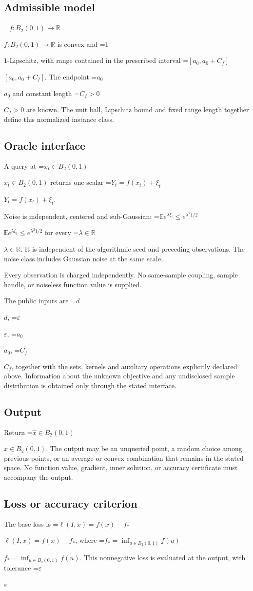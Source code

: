 \documentclass[10pt,a4paper]{article}
\newcommand{\AtlasMath}[1]{\par\begingroup\centering\setbox0=\hbox{$\displaystyle #1$}\ifdim\wd0>1.4\linewidth\typeout{ATLAS WIDE FORMULA: \the\wd0}\fi\ifdim\wd0>\linewidth\resizebox{\linewidth}{!}{\box0}\else\box0\fi\par\endgroup}
\newcommand{\AtlasInlineMath}[1]{\begingroup\setbox0=\hbox{$#1$}\ifdim\wd0>.4\linewidth\endgroup\AtlasMath{#1}\else\endgroup$#1$\fi}
\begin{document}
\subsection{Admissible model}
\AtlasInlineMath{f:B_2(0,1)\to\mathbb{R}} is convex and \AtlasInlineMath{1}-Lipschitz, with range contained in the prescribed interval \AtlasInlineMath{[a_0,a_0+C_f]}. The endpoint \AtlasInlineMath{a_0} and constant length \AtlasInlineMath{C_f>0} are known. The unit ball, Lipschitz bound and fixed range length together define this normalized instance class.

\subsection{Oracle interface}
A query at \AtlasInlineMath{x_t\in B_2(0,1)} returns one scalar \AtlasInlineMath{Y_t=f(x_t)+\xi_t}.

Noise is independent, centered and sub-Gaussian: \AtlasInlineMath{\mathbb{E} e^{\lambda\xi_t}\le e^{\lambda^2 1/2}} for every \AtlasInlineMath{\lambda\in\mathbb{R}}. It is independent of the algorithmic seed and preceding observations. The noise class includes Gaussian noise at the same scale.

Every observation is charged independently. No same-sample coupling, sample handle, or noiseless function value is supplied.

The public inputs are \AtlasInlineMath{d}, \AtlasInlineMath{\varepsilon}, \AtlasInlineMath{a_0}, \AtlasInlineMath{C_f}, together with the sets, kernels and auxiliary operations explicitly declared above. Information about the unknown objective and any undisclosed sample distribution is obtained only through the stated interface.

\subsection{Output}
Return \AtlasInlineMath{\widehat{x}\in B_2(0,1)}. The output may be an unqueried point, a random choice among previous points, or an average or convex combination that remains in the stated space. No function value, gradient, inner solution, or accuracy certificate must accompany the output.

\subsection{Loss or accuracy criterion}
The base loss is \AtlasInlineMath{\ell(I,x)=f(x)-f_*}, where \AtlasInlineMath{f_*=\inf_{u\in B_2(0,1)}f(u)}. This nonnegative loss is evaluated at the output, with tolerance \AtlasInlineMath{\varepsilon}.
\end{document}
